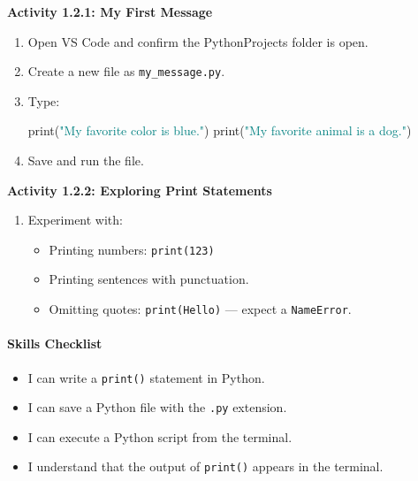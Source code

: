 \documentclass[
  justified,
  openright,
]{tufte-book}
\let\subsubsection\paragraph
\let\paragraph\paragraph
\newcommand{\BuiltInTok}[1]{#1}
\newcommand{\NormalTok}[1]{#1}
\newcommand{\StringTok}[1]{\textcolor{Teal}{#1}}
\newenvironment{Shaded}{%
  \begin{snugshade}
}{%
  \end{snugshade}
}
\let\subsubsection\paragraph
\let\paragraph\paragraph
\providecommand{\tightlist}{%
  \setlength{\itemsep}{0pt}\setlength{\parskip}{0pt}}
\begin{document}
\textbf{Activity 1.2.1: My First Message}

\begin{enumerate}
\def\labelenumi{\arabic{enumi}.}
\item
  Open VS Code and confirm the PythonProjects folder is open.
\item
  Create a new file as \texttt{my\_message.py}.
\item
  Type:

\begin{Shaded}
\begin{Highlighting}[]
\BuiltInTok{print}\NormalTok{(}\StringTok{"My favorite color is blue."}\NormalTok{)}
\BuiltInTok{print}\NormalTok{(}\StringTok{"My favorite animal is a dog."}\NormalTok{)}
\end{Highlighting}
\end{Shaded}
\item
  Save and run the file.
\end{enumerate}

\textbf{Activity 1.2.2: Exploring Print Statements}

\begin{enumerate}
\def\labelenumi{\arabic{enumi}.}
\tightlist
\item
  Experiment with:

  \begin{itemize}
  \tightlist
  \item
    Printing numbers: \texttt{print(123)}
  \item
    Printing sentences with punctuation.
  \item
    Omitting quotes: \texttt{print(Hello)} --- expect a
    \texttt{NameError}.
  \end{itemize}
\end{enumerate}

\subsubsection{Skills Checklist}\label{skills-checklist-5}

\begin{itemize}
\tightlist
\item[$\square$]
  I can write a \texttt{print()} statement in Python.
\item[$\square$]
  I can save a Python file with the \texttt{.py} extension.
\item[$\square$]
  I can execute a Python script from the terminal.
\item[$\square$]
  I understand that the output of \texttt{print()} appears in the
  terminal.
\end{itemize}
\end{document}
